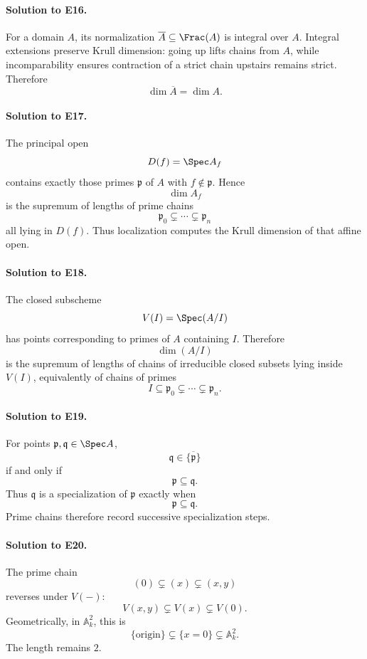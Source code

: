 \paragraph{Solution to E16.}
For a domain \(A\), its normalization \(\overline A\subseteq\Frac(A)\) is integral over \(A\).
Integral extensions preserve Krull dimension: going up lifts chains from \(A\), while
incomparability ensures contraction of a strict chain upstairs remains strict.  Therefore
\[
\boxed{\dim\overline A=\dim A}.
\]

\paragraph{Solution to E17.}
The principal open
\[
D(f)=\Spec A_f
\]
contains exactly those primes \(\mathfrak p\) of \(A\) with \(f\notin\mathfrak p\).  Hence
\[
\dim A_f
\]
is the supremum of lengths of prime chains
\[
\mathfrak p_0\subsetneq\cdots\subsetneq\mathfrak p_n
\]
all lying in \(D(f)\).  Thus localization computes the Krull dimension of that affine open.

\paragraph{Solution to E18.}
The closed subscheme
\[
V(I)=\Spec(A/I)
\]
has points corresponding to primes of \(A\) containing \(I\).  Therefore
\[
\dim(A/I)
\]
is the supremum of lengths of chains of irreducible closed subsets lying inside \(V(I)\), equivalently
of chains of primes
\[
I\subseteq\mathfrak p_0\subsetneq\cdots\subsetneq\mathfrak p_n.
\]

\paragraph{Solution to E19.}
For points \(\mathfrak p,\mathfrak q\in\Spec A\),
\[
\mathfrak q\in\overline{\{\mathfrak p\}}
\]
if and only if
\[
\mathfrak p\subseteq\mathfrak q.
\]
Thus \(\mathfrak q\) is a specialization of \(\mathfrak p\) exactly when
\[
\boxed{\mathfrak p\subseteq\mathfrak q}.
\]
Prime chains therefore record successive specialization steps.

\paragraph{Solution to E20.}
The prime chain
\[
(0)\subsetneq(x)\subsetneq(x,y)
\]
reverses under \(V(-)\):
\[
V(x,y)\subsetneq V(x)\subsetneq V(0).
\]
Geometrically, in \(\mathbb A^2_k\), this is
\[
\{\text{origin}\}
\subsetneq
\{x=0\}
\subsetneq
\mathbb A^2_k.
\]
The length remains \(2\).

